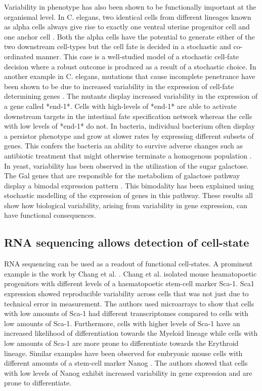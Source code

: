 Variability in phenotype has also been shown to be functionally important at the organismal level. In C. elegans, two identical cells from different lineages known as alpha cells always give rise to exactly one ventral uterine progenitor cell and one anchor cell \cite{seydoux_cell_1989}. Both the alpha cells have the potential to generate either of the two downstream cell-types but the cell fate is decided in a stochastic and co-ordinated manner. This case is a well-studied model of a stochastic cell-fate decision where a robust outcome is produced as a result of a stochastic choice. In another example in C. elegans, mutations that cause incomplete penetrance have been shown to be due to increased variability in the expression of cell-fate determining genes  \cite{raj_variability_2010}.  The mutants display increased variability in the expression of a gene called *end-1*. Cells with high-levels of *end-1* are able to activate downstream targets in the intestinal fate specification network whereas the cells with low levels of *end-1* do not. In bacteria, individual bacterium often display a persistor phenotype and grow at slower rates by expressing different subsets of genes. This confers the bacteria an ability to survive adverse changes such as antibiotic treatment that might otherwise terminate a homogenous population \cite{veening_bet-hedging_2008}. In yeast, variability has been observed in the utilization of the sugar galactose. The Gal genes that are responsible for the metabolism of galactose pathway display a bimodal expression pattern \cite{acar_enhancement_2005}. This bimodality has been explained using stochastic modelling of the expression of genes in this pathway. These results all show how biological variability, arising from variability in gene expression, can have functional consequences. 

\subsection{RNA sequencing allows detection of cell-state }

RNA sequencing can be used as a readout of functional cell-states. A prominent example is the work by Chang et al.  \cite{chang_transcriptome-wide_2008}. Chang et al. isolated mouse heamatopoetic progenitors with different levels of a haematopoetic stem-cell marker Sca-1.  Sca1 expression showed reproducible variability across cells that was not just due to technical error in measurement. The authors used microarrays to show that cells with low amounts of Sca-1 had different transcriptomes compared to cells with low amounts of Sca-1. Furthermore, cells with higher levels of Sca-1 have an increased likelihood of differentiation towards the Myeloid lineage while cells with low amounts of Sca-1 are more prone to differentiate towards the Erythroid lineage. Similar examples have been observed for embryonic mouse cells with different amounts of a stem-cell marker Nanog \cite{kalmar_regulated_2009}. The authors showed that cells with low levels of Nanog exhibit increased variability in gene expression and are prone to differentiate.

